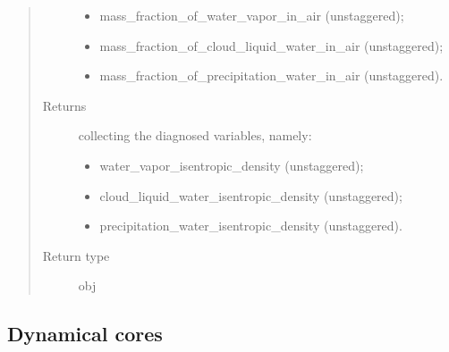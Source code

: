 \documentclass[letterpaper,10pt,english]{sphinxmanual}
\begin{document}
\begin{fulllineitems}
\begin{fulllineitems}
\begin{quote}
\begin{description}
\begin{itemize}
\item {} 
mass\_fraction\_of\_water\_vapor\_in\_air (unstaggered);

\item {} 
mass\_fraction\_of\_cloud\_liquid\_water\_in\_air (unstaggered);

\item {} 
mass\_fraction\_of\_precipitation\_water\_in\_air (unstaggered).

\end{itemize}


\item[{Returns}] \leavevmode

{\hyperref[\detokenize{api:tasmania.storages.grid_data.GridData}]{}} collecting the diagnosed variables, namely:
\begin{itemize}
\item {} 
water\_vapor\_isentropic\_density (unstaggered);

\item {} 
cloud\_liquid\_water\_isentropic\_density (unstaggered);

\item {} 
precipitation\_water\_isentropic\_density (unstaggered).

\end{itemize}


\item[{Return type}] \leavevmode
obj

\end{description}\end{quote}

\end{fulllineitems}


\end{fulllineitems}



\subsection{Dynamical cores}
\label{\detokenize{api:dynamical-cores}}
\end{document}
